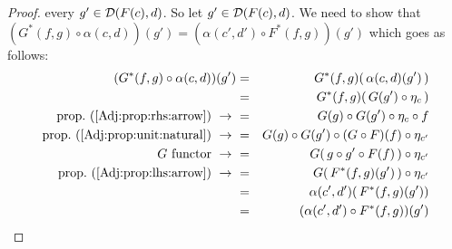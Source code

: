 \begin{proof}
    every $g'\in\mbox{$\cal D$}(F(c),d)$. So let $g'\in\mbox{$\cal D$}(F(c),d)$. We need to show that
    $(G^{*}(f,g)\circ\alpha(c,d))(g')=(\alpha(c',d')\circ F^{*}(f,g))(g')$
    which goes as follows:
        \begin{eqnarray*}(G^{*}(f,g)\circ\alpha(c,d))(g')
            &=&G^{*}(f,g)(\,\alpha(c,d)(g')\,)\\
            &=&G^{*}(f,g)(\,G(g')\circ\eta_{c}\,)\\
            \mbox{prop.~(\ref{Adj:prop:rhs:arrow})}\ \to\ 
            &=&G(g)\circ G(g')\circ\eta_{c}\circ f\\
            \mbox{prop.~(\ref{Adj:prop:unit:natural})}\ \to\ 
            &=&G(g)\circ G(g')\circ (G\circ F)(f)\circ\eta_{c'}\\
            \mbox{$G$ functor}\ \to\ 
            &=&G(\,g\circ g'\circ F(f)\,)\circ\eta_{c'}\\
            \mbox{prop.~(\ref{Adj:prop:lhs:arrow})}\ \to\ 
            &=&G(\,F^{*}(f,g)(g')\,)\circ\eta_{c'}\\
            &=&\alpha(c',d')(\,F^{*}(f,g)(g'))\\
            &=&(\alpha(c',d')\circ F^{*}(f,g))(g')\\
        \end{eqnarray*}
\end{proof}
